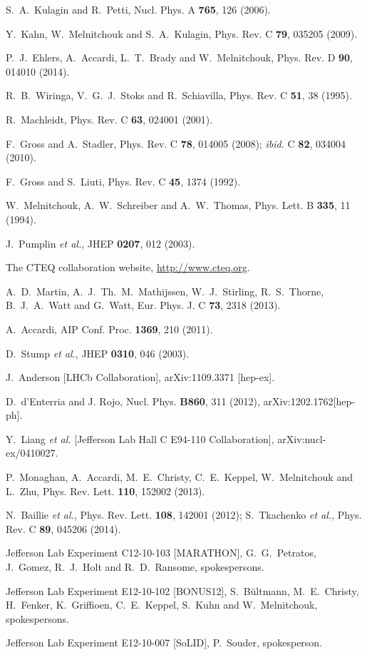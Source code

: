 \documentclass[aps,prd,amsmath,preprint]{revtex4}
\begin{document}
\begin{thebibliography}{99}
S.~A.~Kulagin and R.~Petti,
Nucl. Phys. A {\bf 765}, 126 (2006).

Y.~Kahn, W.~Melnitchouk and S.~A.~Kulagin,
Phys. Rev. C {\bf 79}, 035205 (2009).

P.~J.~Ehlers, A.~Accardi, L.~T.~Brady and W.~Melnitchouk,
Phys. Rev. D {\bf 90}, 014010 (2014).

R.~B.~Wiringa, V.~G.~J.~Stoks and R.~Schiavilla,
Phys. Rev. C {\bf 51}, 38 (1995).

R.~Machleidt,
Phys. Rev. C {\bf 63}, 024001 (2001).

F.~Gross and A.~Stadler,
Phys. Rev. C {\bf 78}, 014005 (2008);
{\it ibid.} C {\bf 82}, 034004 (2010).

F.~Gross and S.~Liuti,
Phys. Rev. C {\bf 45}, 1374 (1992).

W.~Melnitchouk, A.~W.~Schreiber and A.~W.~Thomas,
Phys. Lett. B {\bf 335}, 11 (1994).

J.~Pumplin {\it et al.},
JHEP {\bf 0207}, 012 (2003).
 

The CTEQ collaboration website,
\url{http://www.cteq.org}.

A.~D.~Martin, A.~J.~Th.~M.~Mathijssen, W.~J.~Stirling, R.~S.~Thorne, 
B.~J.~A.~Watt and G.~Watt,
Eur. Phys. J. C {\bf 73}, 2318 (2013).

A.~Accardi,
AIP Conf. Proc. {\bf 1369}, 210 (2011).

D.~Stump {\it et al.},
JHEP {\bf 0310}, 046 (2003).

J.~Anderson [LHCb Collaboration],
arXiv:1109.3371 [hep-ex].

D.~d'Enterria and J. Rojo, Nucl. Phys. {\bf B860}, 311 (2012), 
arXiv:1202.1762[hep-ph].

Y.~Liang {\it et al.} [Jefferson Lab Hall C E94-110 Collaboration],
arXiv:nucl-ex/0410027.

P.~Monaghan, A.~Accardi, M.~E.~Christy, C.~E.~Keppel, W.~Melnitchouk
and L.~Zhu,
Phys. Rev. Lett. {\bf 110}, 152002 (2013).

N.~Baillie {\it et al.},
Phys. Rev. Lett. {\bf 108}, 142001 (2012);
%
S.~Tkachenko {\it et al.},
Phys. Rev. C {\bf 89}, 045206 (2014).

Jefferson Lab Experiment C12-10-103 [MARATHON],
G.~G.~Petratos, J.~Gomez, R.~J.~Holt and R.~D.~Ransome,
spokespersons.
 
Jefferson Lab Experiment E12-10-102 [BONUS12],
S.~B\"ultmann, M.~E.~Christy, H.~Fenker, K.~Griffioen, C.~E.~Keppel,
S.~Kuhn and W.~Melnitchouk,
spokespersons.
 
Jefferson Lab Experiment E12-10-007 [SoLID],
P.~Souder, spokesperson.

\end{thebibliography}
\end{document}
